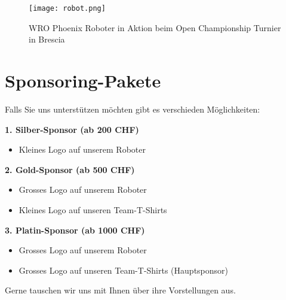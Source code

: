 \documentclass[11pt]{article}
\begin{document}
    \begin{figure}[h]
        \centering
        \texttt{[image: robot.png]}
        \caption*{WRO Phoenix Roboter in Aktion beim Open Championship Turnier in Brescia}
        \label{fig:robot}
    \end{figure}

    \section*{Sponsoring-Pakete}
    Falls Sie uns unterstützen möchten gibt es verschieden Möglichkeiten:

    \textbf{1. Silber-Sponsor (ab 200 CHF)}
    \begin{itemize}
        \item Kleines Logo auf unserem Roboter
    \end{itemize}

    \noindent\textbf{2. Gold-Sponsor (ab 500 CHF)}
    \begin{itemize}
        \item Grosses Logo auf unserem Roboter
        \item Kleines Logo auf unseren Team-T-Shirts
    \end{itemize}

    \noindent\textbf{3. Platin-Sponsor (ab 1000 CHF)}
    \begin{itemize}
        \item Grosses Logo auf unserem Roboter
        \item Grosses Logo auf unseren Team-T-Shirts (Hauptsponsor)
    \end{itemize}

    \noindent Gerne tauschen wir uns mit Ihnen über ihre Vorstellungen aus.

\end{document}
